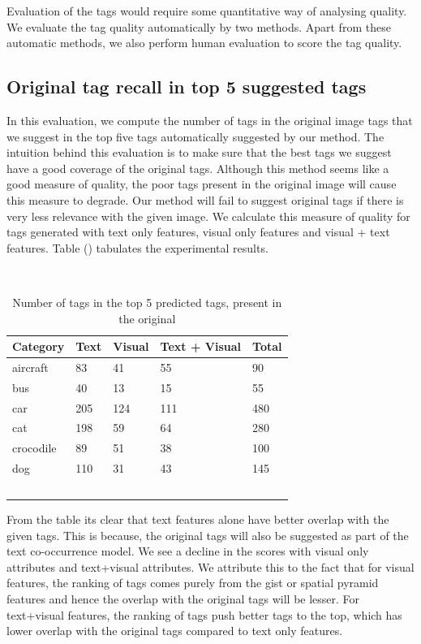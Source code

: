 \documentclass[12pt]{article}
\begin{document}
Evaluation of the tags would require some quantitative way of analysing quality. We evaluate
the tag quality automatically by two methods. Apart from these automatic methods, we also
perform human evaluation to score the tag quality.

\subsection{Original tag recall in top 5 suggested tags}
In this evaluation, we compute the number of tags in the original image tags that we suggest
in the top five tags automatically suggested by our method. The intuition behind this evaluation
is to make sure that the best tags we suggest have a good coverage of the original tags. Although
this method seems like a good measure of quality, the poor tags present in the original image
will cause this measure to degrade. Our method will fail to suggest original tags if there is
very less relevance with the given image. We calculate this measure of quality for tags generated
with text only features, visual only features and visual + text features. Table () tabulates the
experimental results.


\begin{table}
  \caption{Number of tags in the top 5 predicted tags, present in
  the original}
    \begin{tabular}{|l|l|l|l|l|}
\hline
Category & Text & Visual & Text + Visual & Total \\
\hline
aircraft & 83 & 41 & 55 & 90 \\
bus & 40 & 13 & 15 & 55 \\
car & 205 & 124 & 111 & 480 \\
cat & 198 & 59 & 64 & 280 \\
crocodile & 89 & 51 & 38 & 100 \\
dog & 110 & 31 & 43 & 145 \\
\hline
    \end{tabular}
\end{table}

From the table its clear that text features alone have better overlap with the given tags.
This is because, the original tags will also be suggested as part of the text co-occurrence
model. We see a decline in the scores with visual only attributes and text+visual attributes.
We attribute this to the fact that for visual features, the ranking of tags comes purely from
the gist or spatial pyramid features and hence the overlap with the original tags will be lesser.
For text+visual features, the ranking of tags push better tags to the top, which has lower overlap
with the original tags compared to text only features.
\end{document}
